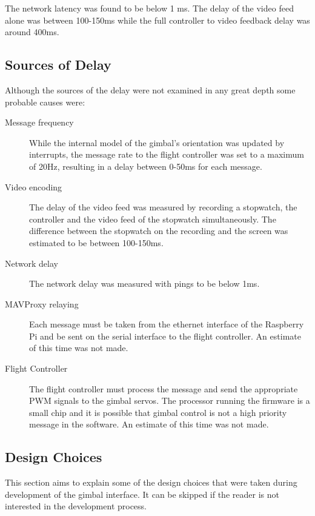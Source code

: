 \documentclass[nofilelist]{cslthse-msc}
\begin{document}
The network latency was found to be below 1 ms. The delay of the video feed alone was between 100-150ms while the full controller to video feedback delay was around 400ms. 

\subsection{Sources of Delay}
Although the sources of the delay were not examined in any great depth some probable causes were:
\begin{description}
   \item[Message frequency] 
   While the internal model of the gimbal's orientation was updated by interrupts, the message rate to the flight controller was set to a maximum of 20Hz, resulting in a delay between 0-50ms for each message.
   
   \item [Video encoding]
   The delay of the video feed was measured by recording a stopwatch, the controller and the video feed of the stopwatch simultaneously. The difference between the stopwatch on the recording and the screen was estimated to be between 100-150ms.
   
   \item [Network delay] 
   The network delay was measured with pings to be below 1ms. 

   \item[MAVProxy relaying] Each message must be taken from the ethernet interface of the Raspberry Pi and be sent on the serial interface to the flight controller. An estimate of this time was not made.
   
   \item[Flight Controller] The flight controller must process the message and send the appropriate PWM signals to the gimbal servos. The processor running the firmware is a small chip and it is possible that gimbal control is not a high priority message in the software. An estimate of this time was not made.
\end{description}

\subsection{Design Choices} 
This section aims to explain some of the design choices that were taken during development of the gimbal interface. It can be skipped if the reader is not interested in the development process.
\end{document}

